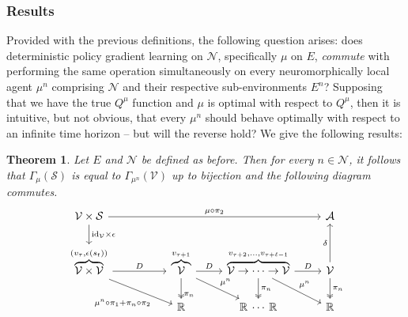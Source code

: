 \documentclass{article} %
\newtheorem{theorem}{Theorem}
\numberwithin{equation}{subsection}
\numberwithin{theorem}{subsection}
\def\reals{{\mathbb R}}
\def\scriptv{{\mathcal V}}
\def\scripta{{\mathcal A}}
\def\scriptn{{\mathcal N}}
\def\scripts{{\mathcal S}}
\begin{document}
\subsubsection{Results}
Provided with the previous definitions, the following question arises: does deterministic policy gradient learning on $\scriptn$, specifically $\mu$ on $E$, \emph{commute} with performing the same operation simultaneously on every neuromorphically local agent $\mu^n$ comprising $\scriptn$ and their respective sub-environments $E^n$? Supposing that we have the true $Q^\mu$ function and $\mu$ is optimal with respect to $Q^\mu$, then it is intuitive, but not obvious, that every $\mu^n$ should behave optimally with respect to an infinite time horizon -- but will the reverse hold? We give the following results:
\begin{theorem}
	Let $E$ and $\scriptn$ be defined as before. Then for every $n \in \scriptn$, it follows that $\Gamma_\mu(\scripts)$ is equal to $\Gamma_{\mu^n}(\scriptv)$ up to bijection and the following diagram commutes.
\begin{equation}\label{eq:sub_env_com}
          \begin{tikzcd} %
			  \scriptv  \times \scripts \arrow{rrr}{\mu\circ\pi_2}
             \arrow{d}
               {\mathrm{id}_\scriptv\times\epsilon}  &[+25pt]    &     & \scripta    \\
  				\overbrace{\scriptv \times \scriptv}^{(v_{\tau},\epsilon(s_t))}
               				\arrow{r}{D}
			   	                        \arrow[pos = 0.7]{rd}[swap]{\mu^n\circ\pi_1 + \pi_n\circ\pi_2}
               				& \overbrace{\scriptv}^{v_{\tau+1}}
                                            \arrow{rd}
                                            {\mu^n}
                                            \arrow[two heads, pos=0.8]
                                              {d}
                                              {\pi_n}
                                              \arrow{r}
                                              {D}  & \overbrace{\scriptv\rightarrow\cdots\rightarrow\scriptv}^{v_{\tau+2},\dots,v_{\tau+{\ell-1}}}
                                              		 \arrow{r}{D}
                                              		 \arrow[two heads]{d}{\pi_n}
                                              		 \arrow{rd}{\mu^n}
                                              					& \scriptv
                                              					\arrow{u}{\delta}
                                              					\arrow[two heads]{d}{\pi_n} \\
  &\reals& \reals\:\cdots\:\reals & \reals
         \end{tikzcd}
    \end{equation}
\end{theorem}
\end{document}

